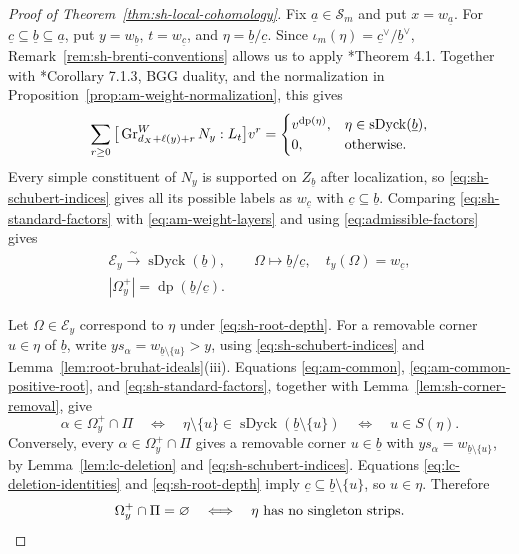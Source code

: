 \documentclass[12pt]{amsart}
\renewcommand{\a}{\underline{a}}
\renewcommand{\b}{\underline{b}}
\newcommand{\mc}[1]{\mathcal{#1}}
\theoremstyle{definition}
\numberwithin{equation}{section}
\begin{document}
\begin{proof}[Proof of Theorem~\ref{thm:sh-local-cohomology}]
Fix $\a\in\mc S_m$ and put $x=w_{\a}$.
For $\underline c\subseteq\b\subseteq\a$, put
$y=w_{\b}$, $t=w_{\underline c}$, and
$\eta=\b/\underline c$.
Since $\iota_m(\eta)=\underline c^\vee/\b^\vee$,
Remark~\ref{rem:sh-brenti-conventions} allows us to apply
\cite{brenti}*{Theorem 4.1}.
Together with \cite{irvingBook}*{Corollary 7.1.3},
BGG duality, and the normalization in
Proposition~\ref{prop:am-weight-normalization}, this gives
\begin{equation}\label{eq:sh-standard-factors}
\sum_{r\geq0}
\big[\operatorname{Gr}^W_{d_X+\ell(y)+r}N_y:L_t\big]v^r
=\begin{cases}
v^{\operatorname{dp}(\eta)},
   &\eta\in\operatorname{sDyck}(\b),\\
0,&\textnormal{otherwise}.
\end{cases}
\end{equation}
Every simple constituent of $N_y$ is supported on $Z_{\b}$
after localization, so \eqref{eq:sh-schubert-indices} gives
all its possible labels as $w_{\underline c}$ with
$\underline c\subseteq\b$.
Comparing \eqref{eq:sh-standard-factors} with
\eqref{eq:am-weight-layers} and using
\eqref{eq:admissible-factors} gives
\begin{equation}\label{eq:sh-root-depth}
\begin{gathered}
\mathscr E_y\xrightarrow{\sim}\operatorname{sDyck}(\b),\qquad
\Omega\longmapsto\b/\underline c,
\quad t_y(\Omega)=w_{\underline c},\\
|\Omega_y^+|=\operatorname{dp}(\b/\underline c).
\end{gathered}
\end{equation}

Let $\Omega\in\mathscr E_y$ correspond to $\eta$ under
\eqref{eq:sh-root-depth}.
For a removable corner $u\in\eta$ of $\b$, write
$ys_\alpha=w_{\b\setminus\{u\}}>y$, using
\eqref{eq:sh-schubert-indices} and
Lemma~\ref{lem:root-bruhat-ideals}\textup{(iii)}.
Equations \eqref{eq:am-common},
\eqref{eq:am-common-positive-root}, and
\eqref{eq:sh-standard-factors}, together with
Lemma~\ref{lem:sh-corner-removal}, give
\[
\alpha\in\Omega_y^+\cap\Pi
\quad\Longleftrightarrow\quad
\eta\setminus\{u\}\in
\operatorname{sDyck}(\b\setminus\{u\})
\quad\Longleftrightarrow\quad u\in S(\eta).
\]
Conversely, every $\alpha\in\Omega_y^+\cap\Pi$ gives a
removable corner $u\in\b$ with
$ys_\alpha=w_{\b\setminus\{u\}}$, by
Lemma~\ref{lem:lc-deletion} and \eqref{eq:sh-schubert-indices}.
Equations \eqref{eq:lc-deletion-identities} and
\eqref{eq:sh-root-depth} imply
$\underline c\subseteq\b\setminus\{u\}$, so $u\in\eta$.
Therefore
\begin{equation}\label{eq:sh-terminal-condition}
\Omega_y^+\cap\Pi=\varnothing
\quad\Longleftrightarrow\quad
\eta\textnormal{ has no singleton strips}.
\end{equation}


\end{proof}
\end{document}
